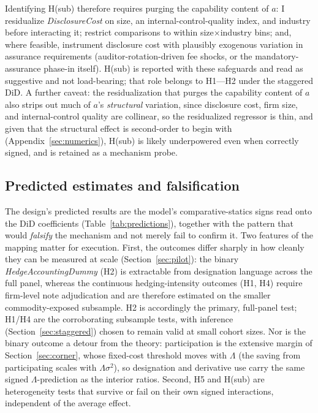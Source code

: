 \documentclass[11pt,a4paper]{article}
\begin{document}
Identifying H(sub) therefore requires purging the capability content of $a$: I residualize \emph{DisclosureCost} on size, an internal-control-quality index, and industry before interacting it; restrict comparisons to within size$\times$industry bins; and, where feasible, instrument disclosure cost with plausibly exogenous variation in assurance requirements (auditor-rotation-driven fee shocks, or the mandatory-assurance phase-in itself). H(sub) is reported with these safeguards and read as suggestive and not load-bearing; that role belongs to H1---H2 under the staggered DiD. A further caveat: the residualization that purges the capability content of $a$ also strips out much of $a$'s \emph{structural} variation, since disclosure cost, firm size, and internal-control quality are collinear, so the residualized regressor is thin, and given that the structural effect is second-order to begin with (Appendix~\ref{sec:numerics}), H(sub) is likely underpowered even when correctly signed, and is retained as a mechanism probe.

\subsection{Predicted estimates and falsification}
\label{sec:predictions}

The design's predicted results are the model's comparative-statics signs read onto the DiD coefficients (Table~\ref{tab:predictions}), together with the pattern that would \emph{falsify} the mechanism and not merely fail to confirm it. Two features of the mapping matter for execution. First, the outcomes differ sharply in how cleanly they can be measured at scale (Section~\ref{sec:pilot}): the binary \emph{HedgeAccountingDummy} (H2) is extractable from designation language across the full panel, whereas the continuous hedging-intensity outcomes (H1, H4) require firm-level note adjudication and are therefore estimated on the smaller commodity-exposed subsample. H2 is accordingly the primary, full-panel test; H1/H4 are the corroborating subsample tests, with inference (Section~\ref{sec:staggered}) chosen to remain valid at small cohort sizes. Nor is the binary outcome a detour from the theory: participation is the extensive margin of Section~\ref{sec:corner}, whose fixed-cost threshold moves with $\Lambda$ (the saving from participating scales with $\Lambda\sigma^2$), so designation and derivative use carry the same signed $\Lambda$-prediction as the interior ratios. Second, H5 and H(sub) are heterogeneity tests that survive or fail on their own signed interactions, independent of the average effect.
\end{document}
